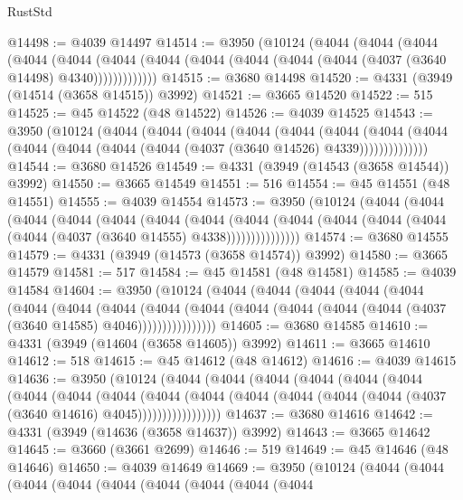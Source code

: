 \begin{lexlean}{RustStd}
\begin{coremodule}
@14498 := @4039 @14497
@14514 := @3950
    (@10124
      (@4044
        (@4044
          (@4044
            (@4044
              (@4044
                (@4044 (@4044 (@4044 (@4044 (@4044 (@4044 (@4037 (@3640 @14498) @4340)))))))))))))
@14515 := @3680 @14498
@14520 := @4331 (@3949 (@14514 (@3658 @14515)) @3992)
@14521 := @3665 @14520
@14522 := 515
@14525 := @45 @14522 (@48 @14522)
@14526 := @4039 @14525
@14543 := @3950
    (@10124
      (@4044
        (@4044
          (@4044
            (@4044
              (@4044
                (@4044
                  (@4044
                    (@4044 (@4044 (@4044 (@4044 (@4044 (@4037 (@3640 @14526) @4339))))))))))))))
@14544 := @3680 @14526
@14549 := @4331 (@3949 (@14543 (@3658 @14544)) @3992)
@14550 := @3665 @14549
@14551 := 516
@14554 := @45 @14551 (@48 @14551)
@14555 := @4039 @14554
@14573 := @3950
    (@10124
      (@4044
        (@4044
          (@4044
            (@4044
              (@4044
                (@4044
                  (@4044
                    (@4044
                      (@4044 (@4044 (@4044 (@4044 (@4044 (@4037 (@3640 @14555) @4338)))))))))))))))
@14574 := @3680 @14555
@14579 := @4331 (@3949 (@14573 (@3658 @14574)) @3992)
@14580 := @3665 @14579
@14581 := 517
@14584 := @45 @14581 (@48 @14581)
@14585 := @4039 @14584
@14604 := @3950
    (@10124
      (@4044
        (@4044
          (@4044
            (@4044
              (@4044
                (@4044
                  (@4044
                    (@4044
                      (@4044
                        (@4044
                          (@4044 (@4044 (@4044 (@4044 (@4037 (@3640 @14585) @4046))))))))))))))))
@14605 := @3680 @14585
@14610 := @4331 (@3949 (@14604 (@3658 @14605)) @3992)
@14611 := @3665 @14610
@14612 := 518
@14615 := @45 @14612 (@48 @14612)
@14616 := @4039 @14615
@14636 := @3950
    (@10124
      (@4044
        (@4044
          (@4044
            (@4044
              (@4044
                (@4044
                  (@4044
                    (@4044
                      (@4044
                        (@4044
                          (@4044
                            (@4044 (@4044 (@4044 (@4044 (@4037 (@3640 @14616) @4045)))))))))))))))))
@14637 := @3680 @14616
@14642 := @4331 (@3949 (@14636 (@3658 @14637)) @3992)
@14643 := @3665 @14642
@14645 := @3660 (@3661 @2699)
@14646 := 519
@14649 := @45 @14646 (@48 @14646)
@14650 := @4039 @14649
@14669 := @3950
    (@10124
      (@4044
        (@4044
          (@4044
            (@4044
              (@4044
                (@4044
                  (@4044
                    (@4044
                      (@4044

\end{coremodule}
\end{lexlean}
